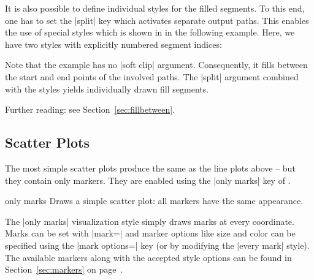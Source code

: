 {{It is also possible to define individual styles for the filled segments. To
this end, one has to set the |split| key which activates separate output paths.
This enables the use of special styles which is shown in in the following
example. Here, we have two styles with explicitly numbered segment indices:
%
\begin{codeexample}[]
\end{codeexample}
%
\noindent Note that the example has no |soft clip| argument. Consequently, it
fills between the start and end points of the involved paths. The |split|
argument combined with the styles yields individually drawn fill segments.

Further reading: see Section~\ref{sec:fillbetween}.
}




\subsection{Scatter Plots}
\label{sec:pgfplots:scatter:2d}

The most simple scatter plots produce the same as the line plots above -- but
they contain only markers. They are enabled using the |only marks| key of
\Tikz{}.

\begin{plottype}{only marks}
    Draws a simple scatter plot: all markers have the same appearance.
\begin{codeexample}[]
\end{codeexample}
    The |only marks| visualization style simply draws marks at every
    coordinate. Marks can be set with |mark=| and marker
    options like size and color can be specified using the
    |mark options=| key (or by modifying the |every mark|
    style). The available markers along with the accepted style options can be
    found in Section~\ref{sec:markers} on page~\pageref{sec:markers}.
\end{plottype}

}
